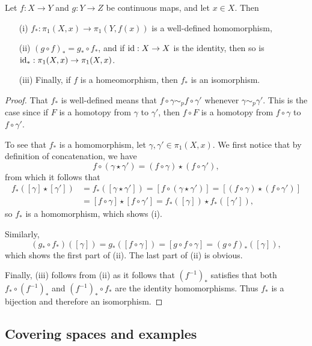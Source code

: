 \begin{thm}
  Let $f : X \to Y$ and $g : Y \to Z$ be continuous maps, and let $x \in X$. Then
  \begin{itemize}
    \item[(i)] $f_*: \pi_1(X,x) \to \pi_1(Y,f(x))$ is a well-defined homomorphism,
    \item[(ii)] $(g \circ f)_* = g_* \circ f_*$, and if $\mathrm{id} : X \to X$ is the identity, then so is $\mathrm{id}_* : \pi_1(X,x) \to \pi_1(X,x)$.
    \item[(iii)] Finally, if $f$ is a homeomorphism, then $f_*$ is an isomorphism.
  \end{itemize}
\end{thm}
\begin{proof}
  That $f_*$ is well-defined means that $f \circ \gamma \sim_p f \circ \gamma'$ whenever $\gamma \sim_p \gamma'$. This is the case since if $F$ is a homotopy from $\gamma$ to $\gamma'$, then $f \circ F$ is a homotopy from $f \circ \gamma$ to $f \circ \gamma'$.
  
  To see that $f_*$ is a homomorphism, let $\gamma, \gamma' \in \pi_1(X,x)$. We first notice that by definition of concatenation, we have
  \[
    f \circ ( \gamma \star \gamma') = (f \circ \gamma) \star (f \circ \gamma'),
  \]
  from which it follows that
  \begin{align*}
    f_*([\gamma] \star [\gamma']) &= f_*([\gamma \star \gamma']) = [f \circ (\gamma \star \gamma')] = [(f \circ \gamma) \star (f \circ \gamma')] \\
      &= [ f \circ \gamma] \star [f \circ \gamma'] = f_*([\gamma]) \star f_*([\gamma']),
  \end{align*}
  so $f_*$ is a homomorphism, which shows (i).
  
  Similarly,
  \[
    (g_* \circ f_*)([\gamma]) = g_* ( [f \circ \gamma]) = [g \circ f \circ \gamma] = (g \circ f)_*([\gamma]),
  \]
  which shows the first part of (ii). The last part of (ii) is obvious.
  
  Finally, (iii) follows from (ii) as it follows that $(f^{-1})_*$ satisfies that both $f_* \circ (f^{-1})_*$ and $(f^{-1})_* \circ f_*$ are the identity homomorphisms. Thus $f_*$ is a bijection and therefore an isomorphism.
\end{proof} 

\subsection{Covering spaces and examples}
